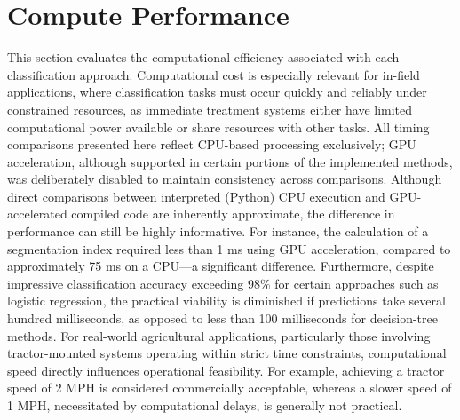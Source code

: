 \documentclass[letterpaper]{report}
\begin{document}
\section{Compute Performance}
\label{section:performance}
This section evaluates the computational efficiency associated with each classification approach. Computational cost is especially relevant for in-field applications, where classification tasks must occur quickly and reliably under constrained resources, as immediate treatment systems either have limited computational power available or share resources with other tasks. All timing comparisons presented here reflect CPU-based processing exclusively; GPU acceleration, although supported in certain portions of the implemented methods, was deliberately disabled to maintain consistency across comparisons. Although direct comparisons between interpreted (Python) CPU execution and GPU-accelerated compiled code are inherently approximate, the difference in performance can still be highly informative. For instance, the calculation of a segmentation index required less than 1 ms using GPU acceleration, compared to approximately 75 ms on a CPU—a significant difference. Furthermore, despite impressive classification accuracy exceeding 98\% for certain approaches such as logistic regression, the practical viability is diminished if predictions take several hundred milliseconds, as opposed to less than 100 milliseconds for decision-tree methods. For real-world agricultural applications, particularly those involving tractor-mounted systems operating within strict time constraints, computational speed directly influences operational feasibility. For example, achieving a tractor speed of 2 MPH is considered commercially acceptable, whereas a slower speed of 1 MPH, necessitated by computational delays, is generally not practical.

{
\renewcommand{\arraystretch}{0.9}

}
\end{document}
